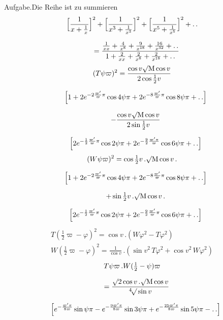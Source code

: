 \begingroup
\renewcommand{\arraystretch}{1.45}

\noindent Aufgabe.\quad Die Reihe ist zu summieren
\[
\begin{gathered}\Bigl[\frac{1}{x+\frac1x}\Bigr]^{2}
+\Bigl[\frac{1}{x^{3}+\frac1{x^{3}}}\Bigr]^{2}
+\Bigl[\frac{1}{x^{5}+\frac1{x^{5}}}\Bigr]^{2}+ .\,.
\\[7pt]\quad{}=\frac{\frac1{xx}+\frac4{x^{8}}+\frac9{x^{18}}+\frac{16}{x^{32}}+ .\,.}
{1+\frac2{xx}+\frac2{x^{8}}+\frac2{x^{18}}+ .\,.}\end{gathered}
\]
\[
\begin{gathered}
(T\psi\varpi)^{2}
=\frac{\cos v\surd\mathrm{M}\cos v}{2\cos\frac12v}
\\[7pt]\quad{}\Bigl[1+2e^{-2\frac{\varpi'}{\varpi}\pi}\cos4\psi\pi
+2e^{-8\frac{\varpi'}{\varpi}\pi}\cos8\psi\pi+ .\,.\Bigr]
\\[7pt]
\quad-\frac{\cos v\surd\mathrm{M}\cos v}{2\sin\frac12v}
\\[7pt]\quad{}\Bigl[2e^{-\frac12\frac{\varpi'}{\varpi}\pi}\cos2\psi\pi
+2e^{-\frac92\frac{\varpi'\pi}{\varpi}}\cos6\psi\pi+ .\,.\Bigr]
\end{gathered}
\]
\[
\begin{gathered}
(W\psi\varpi)^{2}
=\cos\tfrac12v\,.\surd\mathrm{M}\cos v\,.
\\[7pt]\quad{}\Bigl[1+2e^{-2\frac{\varpi'}{\varpi}\pi}\cos4\psi\pi
+2e^{-8\frac{\varpi'}{\varpi}\pi}\cos8\psi\pi+ .\,.\Bigr]
\\[7pt]
\quad+\sin\tfrac12v\,.\surd\mathrm{M}\cos v\,.
\\[7pt]\quad{}\Bigl[2e^{-\frac12\frac{\varpi'}{\varpi}\pi}\cos2\psi\pi
+2e^{-\frac92\frac{\varpi'}{\varpi}\pi}\cos6\psi\pi+ .\,.\Bigr]
\end{gathered}
\]
\[
\begin{gathered}
T(\tfrac12\varpi-\varphi)^{2}=\cos v\,.(W\varphi^{2}-T\varphi^{2})
\\[7pt]
W(\tfrac12\varpi-\varphi)^{2}=\frac1{\cos v}\,.(\sin v^{2}\,T\varphi^{2}+\cos v^{2}\,W\varphi^{2})
\end{gathered}
\]
\[
\begin{gathered}T\psi\varpi\,.W(\tfrac12-\psi)\varpi
\\[7pt]\quad{}=\frac{\surd2\cos v\,.\surd\mathrm{M}\cos v}{{}^{4}\!\surd\sin v}
\\[7pt]\quad{}\Bigl[e^{-\frac{\varpi'\pi}{8\varpi}}\sin\psi\pi
-e^{-\frac{9\varpi'\pi}{8\varpi}}\sin3\psi\pi
+e^{-\frac{25\varpi'\pi}{8\varpi}}\sin5\psi\pi- .\,.\Bigr]\end{gathered}
\]
